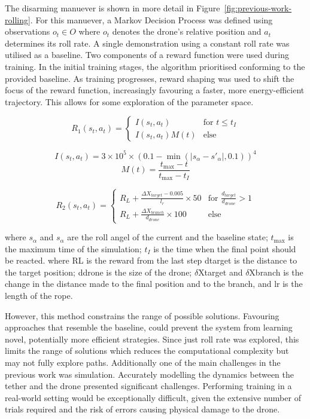 The disarming manuever is shown in more detail in Figure~\ref{fig:previous-work-rolling}.
For this manuever, a Markov Decision Process was defined using observations $o_{t} \in O$ where $o_{t}$ denotes the drone's relative position and $a_{t}$ determines its roll rate.
A single demonstration using a constant roll rate was utilised as a baseline.
Two components of a reward function were used during training.
In the initial training stages, the algorithm prioritised conforming to the provided baseline.
As training progresses, reward shaping was used to shift the focus of the reward function, increasingly favouring a faster, more energy-efficient trajectory.
This allows for some exploration of the parameter space.

\[
R_{1}(s_{t}, a_{t}) = 
\begin{cases} 
I(s_{t}, a_{t}) & \text{for } t \leq t_{I} \\
I(s_{t}, a_{t}) M(t) & \text{else} 
\end{cases}
\]

\[I(s_{t}, a_{t}) = 3 \times 10 ^ 5 \times (0.1 - \min(|s_{\alpha} - s'_{\alpha}|, 0.1)) ^ 4\]
\[M(t) = \frac{t_{\max} - t}{t_{\max} - t_{I}}\]

\[
R_{2}(s_{t}, a_{t}) =
\begin{cases}
  R_{L} + \frac{\Delta X_{target} - 0.005}{l_{r}} \times 50 & \text{for } \frac{d_{target}}{d_{drone}} > 1 \\
  R_{L} + \frac{\Delta X_{branch}}{d_{drone}} \times 100 & \text{else}
\end{cases}
\]

where $s_{\alpha}$ and $s_{\alpha}$ are the roll angel of the current and the baseline state; 
$t_{\max}$ is the maximum time of the simulation; 
$t_{I}$ is the time when the final point should be reacted.
where RL is the reward from the last step dtarget is the distance to the target position; 
ddrone is the size of the drone; 
$\delta$Xtarget and $\delta$Xbranch is the change in the distance made to the final position and to the branch, and lr is the length of the rope.

However, this method constrains the range of possible solutions.
Favouring approaches that resemble the baseline, could prevent the system from learning novel, potentially more efficient strategies.
Since just roll rate was explored, this limits the range of solutions which reduces the computational complexity but may not fully explore paths.
Additionally one of the main challenges in the previous work was simulation.
Accurately modelling the dynamics between the tether and the drone presented significant challenges.
Performing training in a real-world setting would be exceptionally difficult, given the extensive number of trials required and the risk of errors causing physical damage to the drone.

